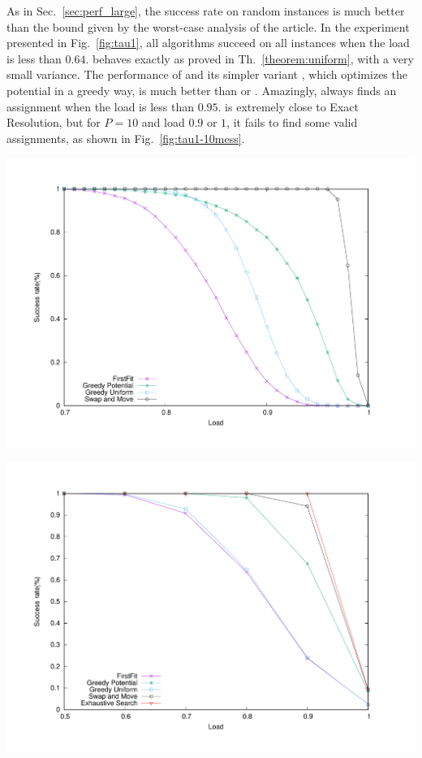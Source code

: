 \documentclass[pdflatex,sn-mathphys,iicol]{sn-jnl}%
\theoremstyle{thmstyleone}%
\theoremstyle{thmstyletwo}%
\theoremstyle{thmstylethree}%
\begin{document}
As in Sec.~\ref{sec:perf_large}, the success rate on random instances is much better than the bound given by the worst-case analysis of the article. In the experiment presented in Fig.~\ref{fig:tau1}, all algorithms succeed on all instances when the load is less than $0.64$. \greedyuniform behaves exactly as proved in Th.~\ref{theorem:uniform}, with a very small variance. The performance of \swapandmove and its simpler variant \greedypotential, which optimizes the potential in a greedy way, is much better than \firstfit or \greedyuniform. Amazingly, \swapandmove always finds an assignment when the load is less than $0.95$. \swapandmove is extremely close to Exact Resolution, but for $P=10$ and load $0.9$ or $1$, it fails to find some valid assignments, as shown in Fig.~\ref{fig:tau1-10mess}.



\begin{center} 
\includegraphics[scale=0.275]{success_tau1} 
\end{center}
\label{fig:tau1}

\begin{center}
\includegraphics[scale=0.275]{tau110}
\end{center}
\label{fig:tau1-10mess}
\end{document}
